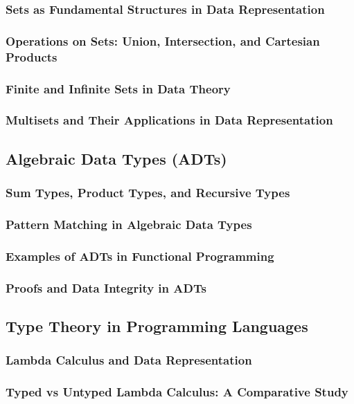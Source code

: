 \documentclass[12pt, oneside]{book}
\begin{document}
\subsubsection{Sets as Fundamental Structures in Data Representation}
\subsubsection{Operations on Sets: Union, Intersection, and Cartesian Products}
\subsubsection{Finite and Infinite Sets in Data Theory}
\subsubsection{Multisets and Their Applications in Data Representation}
\subsection{Algebraic Data Types (ADTs)}
\subsubsection{Sum Types, Product Types, and Recursive Types}
\subsubsection{Pattern Matching in Algebraic Data Types}
\subsubsection{Examples of ADTs in Functional Programming}
\subsubsection{Proofs and Data Integrity in ADTs}
\subsection{Type Theory in Programming Languages}
\subsubsection{Lambda Calculus and Data Representation}
\subsubsection{Typed vs Untyped Lambda Calculus: A Comparative Study}
\end{document}
